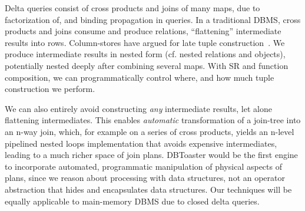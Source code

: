 Delta queries consist of cross products and joins of many maps, due to
factorization of, and binding propagation in queries. In a traditional DBMS,
cross products and joins consume and produce relations, ``flattening''
intermediate results into rows. Column-stores have argued for late tuple
construction~\cite{abadi-icde:07}. We produce intermediate results in nested
form (cf. nested relations and objects), potentially nested deeply after
combining several maps. With SR and function composition, we can
programmatically control where, and how much tuple construction we perform.

We can also entirely avoid constructing \textit{any} intermediate results, let
alone flattening intermediates. This enables \textit{automatic} transformation
of a join-tree into an n-way join, which, for example on a series of cross
products, yields an n-level pipelined nested loops implementation that avoids
expensive intermediates, leading to a much richer space of join plans. DBToaster
would be the first engine to incorporate automated, programmatic manipulation of
physical aspects of plans, since we reason about processing with data
structures, not an operator abstraction that hides and encapsulates data
structures. Our techniques will be equally applicable to main-memory DBMS due to
closed delta queries.


